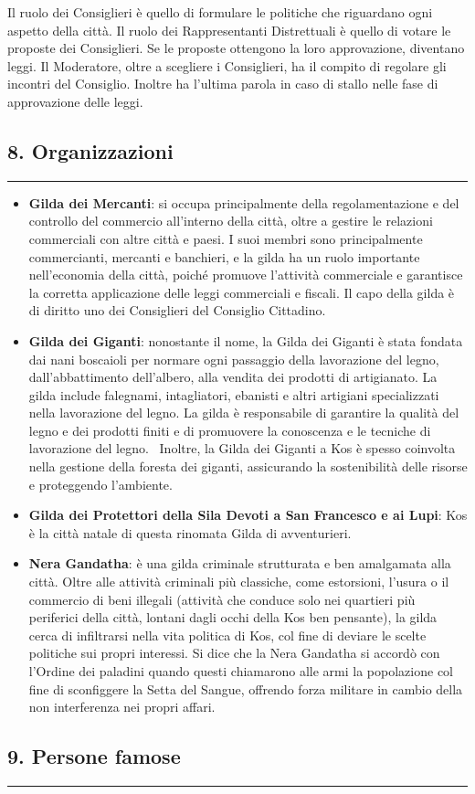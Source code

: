 Il ruolo dei Consiglieri è quello di formulare le politiche che
riguardano ogni aspetto della città. Il ruolo dei Rappresentanti
Distrettuali è quello di votare le proposte dei Consiglieri. Se le
proposte ottengono la loro approvazione, diventano leggi. Il Moderatore,
oltre a scegliere i Consiglieri, ha il compito di regolare gli incontri
del Consiglio. Inoltre ha l'ultima parola in caso di stallo nelle fase
di approvazione delle leggi.

\subsection{8. Organizzazioni}\label{organizzazioni}

\begin{center}\rule{0.5\linewidth}{0.5pt}\end{center}

\begin{itemize}
\tightlist
\item
  \textbf{Gilda dei Mercanti}: si occupa principalmente della
  regolamentazione e del controllo del commercio all'interno della
  città, oltre a gestire le relazioni commerciali con altre città e
  paesi. I suoi membri sono principalmente commercianti, mercanti e
  banchieri, e la gilda ha un ruolo importante nell'economia della
  città, poiché promuove l'attività commerciale e garantisce la corretta
  applicazione delle leggi commerciali e fiscali. Il capo della gilda è
  di diritto uno dei Consiglieri del Consiglio Cittadino.
\item
  \textbf{Gilda dei Giganti}: nonostante il nome, la Gilda dei Giganti è
  stata fondata dai nani boscaioli per normare ogni passaggio della
  lavorazione del legno, dall'abbattimento dell'albero, alla vendita dei
  prodotti di artigianato. La gilda include falegnami, intagliatori,
  ebanisti e altri artigiani specializzati nella lavorazione del legno.
  La gilda è responsabile di garantire la qualità del legno e dei
  prodotti finiti e di promuovere la conoscenza e le tecniche di
  lavorazione del legno.~ Inoltre, la Gilda dei Giganti a Kos è spesso
  coinvolta nella gestione della foresta dei giganti, assicurando la
  sostenibilità delle risorse e proteggendo l'ambiente.
\item
  \textbf{Gilda dei Protettori della Sila Devoti a San Francesco e ai
  Lupi}: Kos è la città natale di questa rinomata Gilda di avventurieri.
\item
  \textbf{Nera Gandatha}: è una gilda criminale strutturata e ben
  amalgamata alla città. Oltre alle attività criminali più classiche,
  come estorsioni, l'usura o il commercio di beni illegali (attività che
  conduce solo nei quartieri più periferici della città, lontani dagli
  occhi della Kos ben pensante), la gilda cerca di infiltrarsi nella
  vita politica di Kos, col fine di deviare le scelte politiche sui
  propri interessi. Si dice che la Nera Gandatha si accordò con l'Ordine
  dei paladini quando questi chiamarono alle armi la popolazione col
  fine di sconfiggere la Setta del Sangue, offrendo forza militare in
  cambio della non interferenza nei propri affari.
\end{itemize}

\subsection{9. Persone famose}\label{persone-famose}

\begin{center}\rule{0.5\linewidth}{0.5pt}\end{center}
